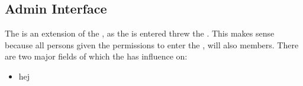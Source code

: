 \subsection{Admin Interface}
\label{sec:admininterface}

The \ainterface[] is an extension of the \sinterface[], as the \ainterface[] is entered threw the \sinterface[]. This makes sense because all persons given the permissions to enter the \ainterface[], will also \astaff[] members. There are two major fields of which the \admin[] has influence on:

\begin{itemize}
	\item hej
\end{itemize}